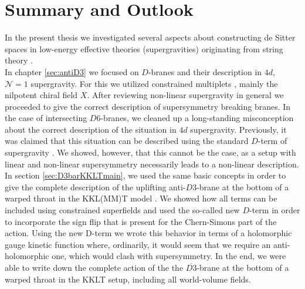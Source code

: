 \documentclass[a4paper,12pt,twoside,openright]{report}
\begin{document}
\chapter{Summary and Outlook}
In the present thesis we investigated several aspects about constructing de Sitter spaces in low-energy effective theories (supergravities) originating from string theory \cite{Roupec:2018mbn,Banlaki:2018ayh,Andriot:2018mav,Cribiori:2019hod,Cribiori:2019bfx,Cribiori:2019drf,Cribiori:2019hrb,Cribiori:2020bgt}.\\
In chapter \ref{sec:antiD3} we focused on $D$-branes and their description in $4d$, $\mathcal{N}=1$ supergravity. For this we utilized constrained multiplets \cite{Rocek:1978nb,Lindstrom:1979kq,Samuel:1982uh,Komargodski:2009rz}, mainly the nilpotent chiral field $X$. After reviewing non-linear supergravity \cite{Farakos:2013ih,Dudas:2015eha,Bergshoeff:2015tra,Hasegawa:2015bza,Ferrara:2015gta,DallAgata:2016syy,Ferrara:2016een} in general we proceeded to give the correct description of supersymmetry breaking branes. In the case of intersecting $D6$-branes, we cleaned up a long-standing misconception about the correct description of the situation in $4d$ supergravity. Previously, it was claimed that this situation can be described using the standard $D$-term of supergravity \cite{Villadoro:2006ia,Blumenhagen:2002wn,Kachru:1999vj,Cvetic:2001nr}. We showed, however, that this cannot be the case, as a setup with linear and non-linear supersymmetry necessarily leads to a non-linear description. In section \ref{sec:D3barKKLTmain}, we used the same basic concepts in order to give the complete description of the uplifting anti-$D3$-brane at the bottom of a warped throat in the KKL(MM)T model \cite{Kachru:2003aw,Kachru:2003sx}. We showed \cite{GarciadelMoral:2017vnz,Cribiori:2019hod} how all terms can be included using constrained superfields and used the so-called new $D$-term \cite{Cribiori:2017laj,Cribiori:2018dlc,Cribiori:2018hxv} in order to incorporate the sign flip that is present for the Chern-Simons part of the action. Using the new D-term we wrote this behavior in terms of a holomorphic gauge kinetic function where, ordinarily, it would seem that we require an anti-holomorphic one, which would clash with supersymmetry. In the end, we were able to write down the complete action of the the $\overline{D3}$-brane at the bottom of a warped throat in the KKLT setup, including all world-volume fields.\\
\end{document}
